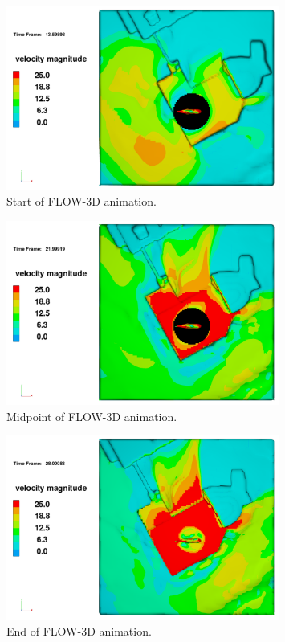 \documentclass[a4paper,11pt]{extarticle}
\begin{document}
\begin{figure}[H]
  \centering
  \includegraphics[width=0.8\textwidth]{gfx/flow3d_anim_start.png}
  \caption{Start of FLOW-3D animation.}
  \label{fig:FLOW3DAnimStart}
\end{figure}

\begin{figure}[H]
  \centering
  \includegraphics[width=0.8\textwidth]{gfx/flow3d_anim_mid.png}
  \caption{Midpoint of FLOW-3D animation.}
  \label{fig:FLOW3DAnimMid}
\end{figure}

\begin{figure}[H]
  \centering
  \includegraphics[width=0.8\textwidth]{gfx/flow3d_anim_end.png}
  \caption{End of FLOW-3D animation.}
  \label{fig:FLOW3DAnimEnd}
\end{figure}
\end{document}
